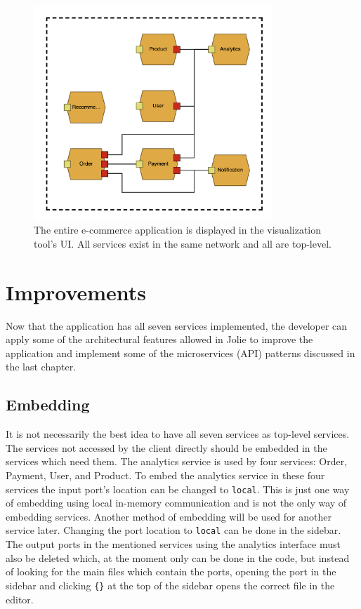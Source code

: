 \begin{figure}[h!]
    \center
    \includegraphics[width=0.8\textwidth]{figures/jv_completed.png}
    \caption{The entire e-commerce application is displayed in the visualization tool's UI. All services exist in the same network and all are top-level.}
    \label{figure:jv_completed}
\end{figure}

\section{Improvements}
Now that the application has all seven services implemented, the developer can apply some of the architectural features allowed in Jolie to improve the application and implement some of the microservices (API) patterns discussed in the last chapter.

\subsection{Embedding}
It is not necessarily the best idea to have all seven services as top-level services. The services not accessed by the client directly should be embedded in the services which need them.
The analytics service is used by four services: Order, Payment, User, and Product. To embed the analytics service in these four services the input port's location can be changed to \texttt{local}. This is just one way of embedding using local in-memory communication and is not the only way of embedding services. Another method of embedding will be used for another service later.
Changing the port location to \texttt{local} can be done in the sidebar.
The output ports in the mentioned services using the analytics interface must also be deleted which, at the moment only can be done in the code, but instead of looking for the main files which contain the ports,
opening the port in the sidebar and clicking \texttt{\{\}} at the top of the sidebar opens the correct file in the editor.

